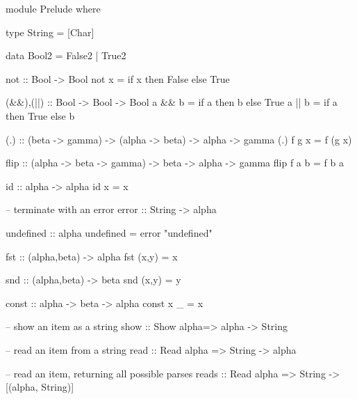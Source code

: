 \begin{code}
module Prelude where

type String = [Char]

data Bool2 = False2 | True2

not :: Bool -> Bool
not x = if x then False else True

(&&),(||) :: Bool -> Bool -> Bool
a && b = if a then b else True
a || b = if a then True else b

(.) :: (beta -> gamma) -> (alpha -> beta) -> alpha -> gamma
(.) f g x = f (g x)

flip :: (alpha -> beta -> gamma) -> beta -> alpha -> gamma
flip f a b = f b a

id :: alpha -> alpha
id x = x

-- terminate with an error
error :: String -> alpha

undefined :: alpha
undefined = error "undefined"

fst :: (alpha,beta) -> alpha
fst (x,y) = x

snd :: (alpha,beta) -> beta
snd (x,y) = y

const :: alpha -> beta -> alpha
const x _ =  x

-- show an item as a string
show :: Show alpha=> alpha -> String

-- read an item from a string
read :: Read alpha => String -> alpha

-- read an item, returning all possible parses
reads :: Read alpha => String -> [(alpha, String)]
\end{code}


